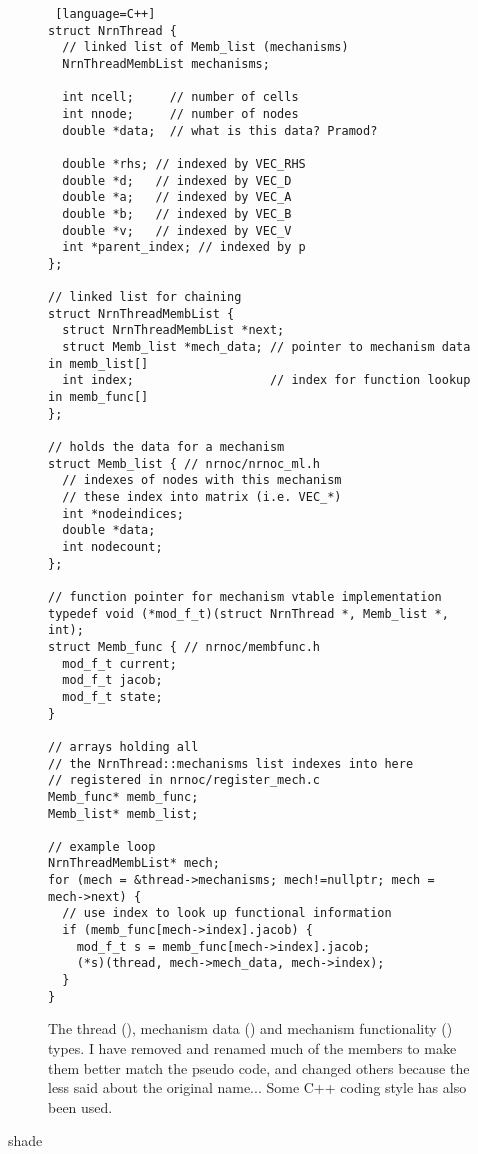 \begin{figure}
\begin{shaded}
\begin{lstlisting} [language=C++]
struct NrnThread {
  // linked list of Memb_list (mechanisms)
  NrnThreadMembList mechanisms;

  int ncell;     // number of cells
  int nnode;     // number of nodes
  double *data;  // what is this data? Pramod?

  double *rhs; // indexed by VEC_RHS
  double *d;   // indexed by VEC_D
  double *a;   // indexed by VEC_A
  double *b;   // indexed by VEC_B
  double *v;   // indexed by VEC_V
  int *parent_index; // indexed by p
};

// linked list for chaining 
struct NrnThreadMembList {
  struct NrnThreadMembList *next;
  struct Memb_list *mech_data; // pointer to mechanism data in memb_list[]
  int index;                   // index for function lookup in memb_func[]
};

// holds the data for a mechanism
struct Memb_list { // nrnoc/nrnoc_ml.h
  // indexes of nodes with this mechanism
  // these index into matrix (i.e. VEC_*)
  int *nodeindices;
  double *data;
  int nodecount;
};

// function pointer for mechanism vtable implementation
typedef void (*mod_f_t)(struct NrnThread *, Memb_list *, int);
struct Memb_func { // nrnoc/membfunc.h
  mod_f_t current;
  mod_f_t jacob;
  mod_f_t state;
}

// arrays holding all 
// the NrnThread::mechanisms list indexes into here
// registered in nrnoc/register_mech.c
Memb_func* memb_func;
Memb_list* memb_list;

// example loop
NrnThreadMembList* mech;
for (mech = &thread->mechanisms; mech!=nullptr; mech = mech->next) {
  // use index to look up functional information
  if (memb_func[mech->index].jacob) {
    mod_f_t s = memb_func[mech->index].jacob;
    (*s)(thread, mech->mech_data, mech->index);
  }
}
\end{lstlisting}
\end{shaded}
\label{lst:NrnThreadInfo}
\caption{The thread (), mechanism data () and mechanism functionality () types. I have removed and renamed much of the members to make them better match the pseudo code, and changed others because the less said about the original name... Some C++ coding style has also been used.}
\end{figure}{shade}

